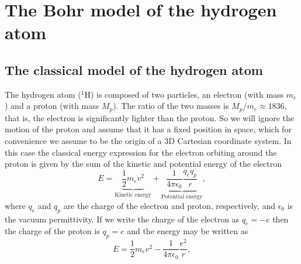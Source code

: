 

\setcounter{section}{1}
\section{The Bohr model of the hydrogen atom}

\subsection{The classical model of the hydrogen atom}
The hydrogen atom ($^1$H) is composed of two particles, an electron (with mass $m_e$) and a proton (with mass $M_p$).
The ratio of the two masses is $M_p/m_e \approx 1836$, that is, the electron is significantly lighter than the proton.
So we will ignore the motion of the proton and assume that it has a fixed position in space, which for convenience we assume to be the origin of a 3D Cartesian coordinate system.
In this case the classical energy expression for the electron orbiting around the proton is given by the sum of the kinetic and potential energy of the electron
\begin{equation}
E = \underbrace{\frac{1}{2} m_e v^2}_{\text{Kinetic energy}}
+ \underbrace{\frac{1}{4 \pi \epsilon_0} \frac{q_e q_p}{r}}_{\text{Potential energy}},
\end{equation}
where $q_e$ and $q_p$ are the charge of the electron and proton, respectively, and $\epsilon_0$ is the vacuum permittivity.
If we write the charge of the electron as $q_e = -e$ then the charge of the proton is $q_p = e$ and the energy may be written as
\begin{equation}
E = \frac{1}{2} m_e v^2 - \frac{1}{4 \pi \epsilon_0} \frac{e^2}{r},
\end{equation}


